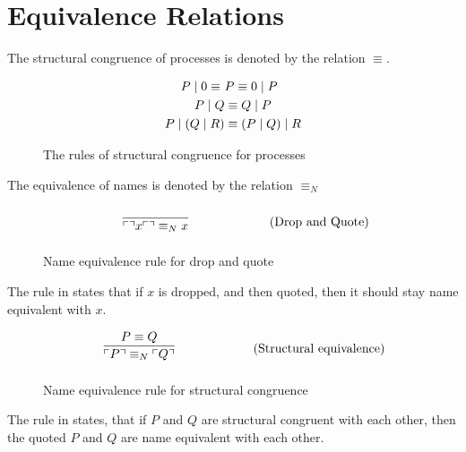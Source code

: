 \section{Equivalence Relations}
The structural congruence of processes is denoted by the relation $\equiv$.

\begin{figure}[h]
    \begin{align*}
        P\mid 0 \equiv\ &P \equiv 0\mid P\\
        P\mid Q &\equiv Q\mid P\\
        P\mid (Q\mid R)&\equiv (P\mid Q)\mid R
    \end{align*}
    \caption{The rules of structural congruence for processes}
\end{figure}


\FloatBarrier

The equivalence of names is denoted by the relation $\equiv _N$

\begin{figure}[h]
	\begin{align}
	& \infrule{}{\quot{\drop{x}}\equiv _N x} \tag{Drop and Quote}
	\end{align}
	\caption{Name equivalence rule for drop and quote}
	\label{fig:dropquot}
\end{figure}

\noindent
The rule in  states that if $x$ is dropped, and then quoted, then it should stay name equivalent with $x$.

\begin{figure}[h]
	\begin{align}
	& \infrule{P\equiv Q}{\quot{P} \equiv _N \quot{Q}} \tag{Structural equivalence}
	\end{align}
	\caption{Name equivalence rule for structural congruence}
	\label{fig:strucequiv}
\end{figure}

\noindent
The rule in  states, that if $P$ and $Q$ are structural congruent with each other, then the quoted $P$ and $Q$ are name equivalent with each other.

